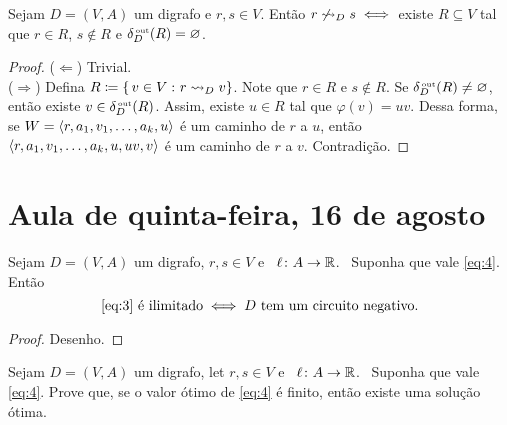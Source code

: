 \documentclass[10pt,reqno]{amsart}
\begin{document}
\begin{theorem}
  Sejam \(D = (V,A)\) um digrafo e \(r,s \in V\).  Então
  \(r \not\reaches_D s \iff\) existe \(R \subseteq V\) tal que
  \(r \in R\), \(s \not\in R\) e \(\deltaout[D](R) = \emptyset\).
\end{theorem}
\begin{proof}
(\(\Leftarrow\)) Trivial.
\\ (\(\Rightarrow\)) Defina \(R \coloneqq \setst{v \in V}{r \reaches_D v}\).
   Note que \(r \in R\) e \(s \notin R\). Se \(\deltaout[D](R) \neq \emptyset\), 
   então existe \(v \in \deltaout[D](R)\). Assim, existe \(u \in R\) tal que
   \(\varphi(v) = uv\). Dessa forma, se \(W = \seq{r,a_1,v_1,\dotsc,a_k,u}\) 
   é um caminho de \(r\) a \(u\), então \(\seq{r,a_1,v_1,\dotsc,a_k,u,uv,v}\)
   é um caminho de \(r\) a \(v\). Contradição.
\end{proof}

\section{Aula de quinta-feira, 16 de agosto}

\begin{proposition}
  \label{prop:2}
  Sejam \(D = (V,A)\) um digrafo, \(r,s \in V\) e
  \(\ell \colon A \to \Reals\).  Suponha que vale \eqref{eq:4}.
  Então
  \begin{equation}
    \label{eq:6}
    \text{\eqref{eq:3} é ilimitado}
    \iff
    \text{\(D\) tem um circuito negativo}.
  \end{equation}
\end{proposition}
\begin{proof} Desenho.
  
\end{proof}

\begin{exercise}
  \label{ex:4}
  Sejam \(D = (V,A)\) um digrafo, let \(r,s \in V\) e
  \(\ell \colon A \to \Reals\).  Suponha que vale \eqref{eq:4}.
  Prove que, se o valor ótimo de \eqref{eq:4} é finito, então
  existe uma solução ótima.
\end{exercise}
\end{document}
